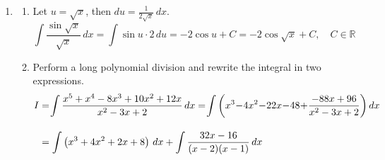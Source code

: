 \documentclass[a4paper, 12pt]{article}
\begin{document}
\begin{enumerate}[leftmargin=*,label=\textbf{\arabic*.}]
\newpage

\begin{align*}V&=2\pi\hspace{-0.2em}\left[\frac{\sqrt{13}-1}2+\frac{\left(1-\sqrt{13}\right)^3}{12}+\frac{\left(1-\sqrt{13}\right)^4}{64}-\frac{1+\sqrt5}2+\frac{\left(1+\sqrt5\right)^3}{12}-\frac{\left(1+\sqrt5\right)^4}{64}\right]\\[1em]&\quad\:+2\pi\left[-\frac23+2-2-\left(\frac{\left(1-\sqrt{13}\right)^3}{12}+\frac{\left(1-\sqrt{13}\right)^2}2+1-\sqrt{13}\right)\right]\\[1em]&\quad\:+2\pi\left[\frac{-1+\sqrt5}2-\frac{\left(-1+\sqrt5\right)^3}{12}-\frac{\left(-1+\sqrt5\right)^4}{64}-\left(-1+\frac23-\frac14\right)\right]\end{align*}

After some mathematical operations, the volume is found to be
\[V=\frac{13\pi}6-\frac{\pi}4\left(47-13\sqrt{13}\right)=\boxed{\frac{\pi\left(39\sqrt{13}-115\right)}{12}}\]

The volume can also be evaluated by integrating over the domain and subtracting the region that is revolved twice. That is, the region beneath the region $2$ mapped on the graph.

\item \begin{enumerate}[leftmargin=*,label=\textbf{\alph*.}]
\item Let $u=\sqrt x$, then $\displaystyle du=\frac1{2\sqrt x}\,dx$.
\[\int\frac{\sin\sqrt x}{\sqrt x}\,dx=\int\sin u\cdot2\,du=-2\cos u+C=\boxed{-2\cos\sqrt x+C,\quad C\in\mathbb{R}}\]

\item Perform a long polynomial division and rewrite the integral in two expressions.
\begin{align}I&=\hspace{-0.2em}\int\frac{x^5+x^4-8x^3+10x^2+12x}{x^2-3x+2}\,dx=\hspace{-0.2em}\int\left(x^3\hspace{-0.2em}-\hspace{-0.2em}4x^2\hspace{-0.2em}-\hspace{-0.2em}22x\hspace{-0.2em}-\hspace{-0.2em}48\hspace{-0.2em}+\hspace{-0.2em}\frac{-88x+96}{x^2-3x+2}\right)dx\nonumber\\[1em]&=\int\left(x^3+4x^2+2x+8\right)\,dx+\int\frac{32x-16}{(x-2)(x-1)}\,dx\label{eq:15_16_fall_final_2}\end{align}


\end{enumerate}
\end{enumerate}
\end{document}
